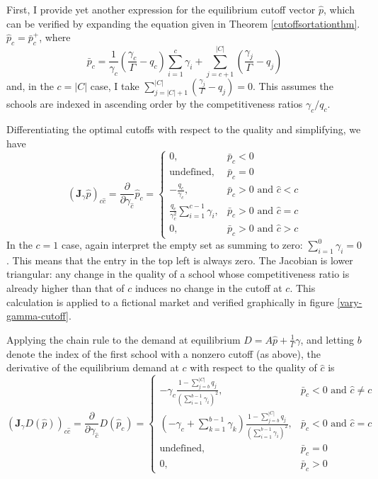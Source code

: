 \documentclass[12pt]{article}
\numberwithin{equation}{subsection}
\theoremstyle{definition}
\begin{document}
First, I provide yet another expression for the equilibrium cutoff vector $\hat p$, which can be verified by expanding the equation given in Theorem \ref{cutoffsortationthm}. $\hat p_c = \bar p_c^+$, where
\begin{equation} \label{yetanothereqcutoff}
\bar p_c = 
\frac{1}{\gamma_c} \left(\frac{\gamma_c}{\Gamma} - q_c\right) \sum_{i=1}^{c} \gamma_i 
+ \sum_{j=c+1}^{|C|} \left( \frac{\gamma_j}{\Gamma} - q_j \right)
\end{equation}
and, in the $c = |C|$ case, I take $\sum_{j=|C|+1}^{|C|} \left( \frac{\gamma_j}{\Gamma} - q_j \right)= 0$. This assumes the schools are indexed in ascending order by the competitiveness ratios $\gamma_c / q_c$. 

Differentiating the optimal cutoffs with respect to the quality and simplifying, we have
\begin{equation}\label{jac-gamma-p}
\left(\mathbf{J}_\gamma \hat p\right)_{c\hat c} =
\frac{\partial}{\partial\gamma_{\hat c}} \hat p_c = \begin{cases}
0, & \bar p_c < 0 \\
\text{undefined}, & \bar p_c = 0 \\
 - \frac{q_c}{\gamma_c}, & \bar p_c > 0 \text{ and }\hat c < c \\
\frac{q_c}{\gamma_c^2} \sum_{i=1}^{c-1} \gamma_i, & \bar p_c > 0 \text{ and }\hat c = c\\
0, & \bar p_c > 0 \text{ and }\hat c > c
\end{cases}
\end{equation}
In the $c=1$ case, again interpret the empty set as summing to zero: $\sum_{i=1}^{0} \gamma_i = 0$. This means that the entry in the top left is always zero. The Jacobian is lower triangular: any change in the quality of a school whose competitiveness ratio is already higher than that of $c$ induces no change in the cutoff at $c$. This calculation is applied to a fictional market and verified graphically in figure \ref{vary-gamma-cutoff}.

Applying the chain rule to the demand at equilibrium $D = A \hat p + \frac{1}{\Gamma} \gamma$, and letting $b$ denote the index of the first school with a nonzero cutoff (as above), the derivative of the equilibrium demand at $c$ with respect to the quality of $\hat c$ is
\begin{equation} \label{jac-gamma-demand}
\left(\mathbf{J}_\gamma D\left(\hat p\right)\right)_{c\hat c} =
\frac{\partial}{\partial\gamma_{\hat c}} D(\hat p_c) = \begin{cases}
-\gamma_c \frac{1 - \sum_{j=b}^{|C|} q_j}{\left(\sum_{i=1}^{b-1} \gamma_i\right)^2}, & \bar p_c < 0 \text{ and }\hat c \neq c \\
\left(- \gamma_c + \sum_{k=1}^{b-1} \gamma_k\right)\frac{1 - \sum_{j=b}^{|C|} q_j}{\left(\sum_{i=1}^{b-1} \gamma_i\right)^2}, & \bar p_c < 0 \text{ and }\hat c = c\\
\text{undefined}, & \bar p_c = 0 \\
0, & \bar p_c > 0
\end{cases}
\end{equation}
\end{document}
